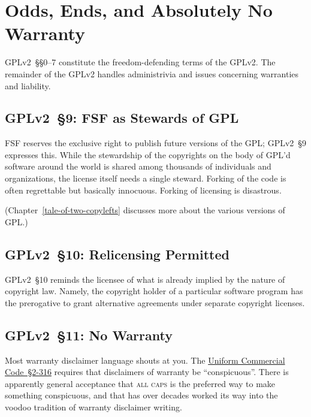 \chapter{Odds, Ends, and Absolutely No Warranty}

GPLv2~\S\S0--7 constitute the freedom-defending terms of the GPLv2.  The remainder
of the GPLv2 handles administrivia and issues concerning warranties and
liability.

\section{GPLv2~\S9: FSF as Stewards of GPL}
\label{GPLv2s9}

FSF reserves the exclusive right to publish future versions of the GPL\@;
GPLv2~\S9 expresses this.  While the stewardship of the copyrights on the body
of GPL'd software around the world is shared among thousands of
individuals and organizations, the license itself needs a single steward.
Forking of the code is often regrettable but basically innocuous.  Forking
of licensing is disastrous.

(Chapter~\ref{tale-of-two-copylefts} discusses more about the various
versions of GPL.)

\section{GPLv2~\S10: Relicensing Permitted}
\label{GPLv2s10}

GPLv2~\S10 reminds the licensee of what is already implied by the nature of
copyright law.  Namely, the copyright holder of a particular software
program has the prerogative to grant alternative agreements under separate
copyright licenses.

\section{GPLv2~\S11: No Warranty}
\label{GPLv2s11}

Most warranty disclaimer language shouts at you.  The
\href{http://www.law.cornell.edu/ucc/2/2-316}{Uniform Commercial
  Code~\S2-316} requires that disclaimers of warranty be ``conspicuous''.
There is apparently general acceptance that \textsc{all caps} is the
preferred way to make something conspicuous, and that has over decades worked
its way into the voodoo tradition of warranty disclaimer writing.

